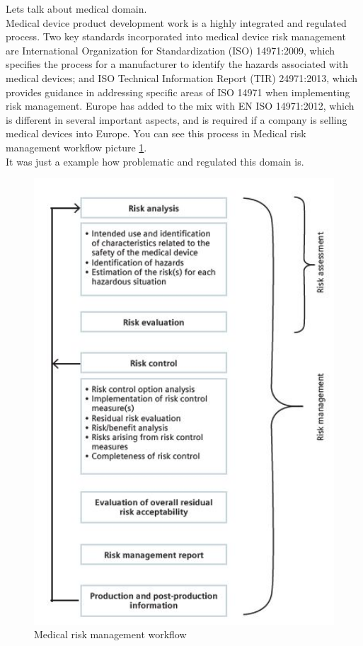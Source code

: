 \documentclass[thesis=M,english]{FITthesis}[2012/06/26]
\begin{document}
Lets talk about medical domain.\\

Medical device product development work is a highly integrated and regulated process. Two key standards incorporated into medical device risk management are International Organization for Standardization (ISO) 14971:2009, which specifies the process for a manufacturer to identify the hazards associated with medical devices; and ISO Technical Information Report (TIR) 24971:2013, which provides guidance in addressing specific areas of ISO 14971 when implementing risk management. Europe has added to the mix with EN ISO 14971:2012, which is different in several important aspects, and is required if a company is selling medical devices into Europe. You can see this process in Medical risk management workflow picture \ref{fig:medical_standard}.\\

It was just a example how problematic and regulated this domain is.\\

\begin{figure}[h!]\centering
	\includegraphics[width=1\textwidth]{pictures/medical_standard}
	\caption{Medical risk management workflow \cite{polarion_alm}}\label{fig:medical_standard}
\end{figure}
\end{document}
